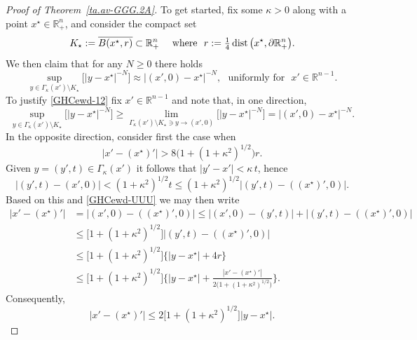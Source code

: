 \documentclass[11pt,reqno]{amsart}
\numberwithin{equation}{section}
\theoremstyle{remark}
\begin{document}
\begin{proof}[Proof of Theorem~\ref{ta.av-GGG.2A}]
To get started, fix some $\kappa>0$ along with a point $x^\star\in\mathbb{R}^n_{+}$, and consider the compact set 
%
\begin{equation}\label{GHCewd-abc}
K_\star:=\overline{B(x^\star,r)}\subset{\mathbb{R}}^n_{+}\quad\text{ where }\,\,
r:=\tfrac14\,{\rm dist}\,\big(x^\star,\partial{\mathbb{R}}^n_{+}\big).
\end{equation}
%
We then claim that for any $N\geq 0$ there holds 
%
\begin{equation}\label{GHCewd-12}
\sup_{y\in\Gamma_\kappa(x')\setminus K_\star}\Big[|y-x^\star|^{-N}\Big]\approx
\big|(x',0)-x^\star\big|^{-N},\,\,\text{ uniformly for }\,\,x'\in{\mathbb{R}}^{n-1}.
\end{equation}
%
To justify \eqref{GHCewd-12} fix $x'\in{\mathbb{R}}^{n-1}$ and note that, 
in one direction, 
%
\begin{equation}\label{GHCewd-13}
\sup_{y\in\Gamma_\kappa(x')\setminus K_\star}\Big[|y-x^\star|^{-N}\Big]
\geq\lim_{\Gamma_\kappa(x')\setminus K_\star\ni y\to(x',0)}\Big[|y-x^\star|^{-N}\Big]
=\big|(x',0)-x^\star\big|^{-N}.
\end{equation}
%
In the opposite direction, consider first the case when 
%
\begin{equation}\label{GHCewd-UUU}
\big|x'-(x^\star)'\big|>8\big(1+(1+\kappa^2)^{1/2}\big)r.
\end{equation}
% 
Given $y=(y',t)\in\Gamma_\kappa(x')$ it follows that $|y'-x'|<\kappa\,t$,
hence 
%
\begin{equation}\label{GHCewd-14}
\big|(y',t)-(x',0)\big|<(1+\kappa^2)^{1/2}t\leq(1+\kappa^2)^{1/2}
\big|(y',t)-((x^\star)',0)\big|.
\end{equation}
%
Based on this and \eqref{GHCewd-UUU} we may then write 
%
\begin{align}\label{GHCewd-15}
|x'-(x^\star)'| &=\big|(x',0)-((x^\star)',0)\big|\leq\big|(x',0)-(y',t)\big|
+\big|(y',t)-((x^\star)',0)\big|
\nonumber\\[4pt]
&\leq\big[1+(1+\kappa^2)^{1/2}\big]\big|(y',t)-((x^\star)',0)\big|
\nonumber\\[4pt]
&\leq\big[1+(1+\kappa^2)^{1/2}\big]\big\{|y-x^\star|+4r\big\}
\nonumber\\[4pt]
&\leq\big[1+(1+\kappa^2)^{1/2}\big]
\Big\{|y-x^\star|+\frac{|x'-(x^\star)'|}{2\big(1+(1+\kappa^2)^{1/2}\big)}\Big\}.
\end{align}
%
Consequently, 
%
\begin{equation}\label{GHCewd-16}
|x'-(x^\star)'|\leq 2\big[1+(1+\kappa^2)^{1/2}\big]|y-x^\star|.
\end{equation}

\end{proof}
\end{document}
